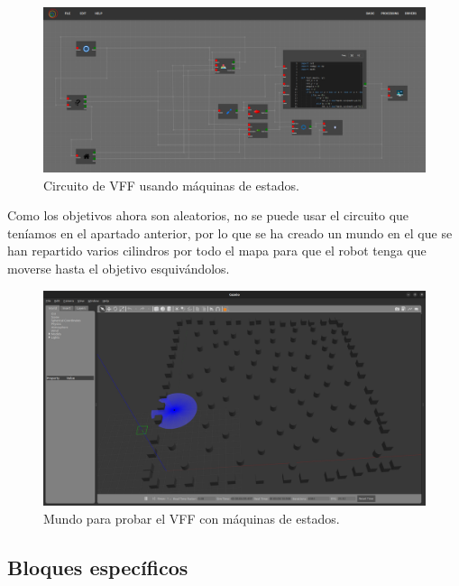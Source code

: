\begin{figure} [H]
    \begin{center}
        \includegraphics[width=13cm]{figs/c6/FSM_circuit.png}
    \end{center}
    \caption[Circuito VFF con FSM]{Circuito de VFF usando máquinas de estados.}
    \label{fig:FSM_circ}
\end{figure}

Como los objetivos ahora son aleatorios, no se puede usar el circuito que teníamos en el apartado anterior, por lo que se ha creado un mundo en el que se han
repartido varios cilindros por todo el mapa para que el robot tenga que moverse hasta el objetivo esquivándolos.

\begin{figure} [H]
    \begin{center}
        \includegraphics[width=13cm]{figs/c6/FSM_world.png}
    \end{center}
    \caption[Mundo VFF con FSM]{Mundo para probar el VFF con máquinas de estados.}
    \label{fig:FSM_circ}
\end{figure}

\subsection{Bloques específicos}
\label{subsec:spec_bloques_FSM}

